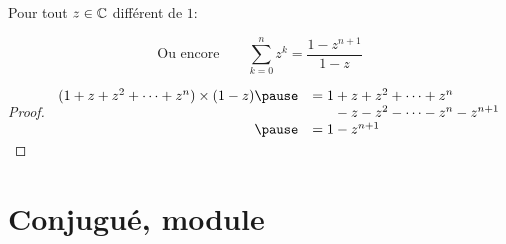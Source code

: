 \begin{frame}

\begin{proposition}
\label{prop:somme}
 Pour tout $z \in \mathbb{C}$ différent de $1$\!:\!\!\!\!
\end{proposition}
\pause
$$\text{Ou encore} \qquad \displaystyle \sum_{k=0}^n z^k = \dfrac{1 - z^{n + 1}}{1 - z}$$

\pause


\begin{proof}
\normalsize
$\begin{array}{rl}
(1 + z + z^2 + \cdots + z^n) \times (1 - z) 
  \pause
  &= 1 + z + z^2 + \cdots + z^n \\
  &\hphantom{= 1 } -z -z^2 - \cdots - z^n - z^{n+1} \\
  \pause
  &= 1 - z^{n + 1}  \\
\end{array}$
\end{proof}

\end{frame}


\section{Conjugué, module}

